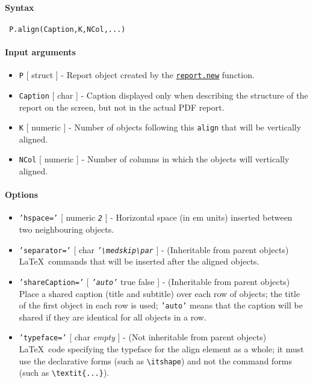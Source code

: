 


	\paragraph{Syntax}
 
 \begin{verbatim}
 P.align(Caption,K,NCol,...)
 \end{verbatim}
 
 \paragraph{Input arguments}
 
 \begin{itemize}
 \item
   \texttt{P} {[} struct {]} - Report object created by the
   \href{report/new}{\texttt{report.new}} function.
 \item
   \texttt{Caption} {[} char {]} - Caption displayed only when describing
   the structure of the report on the screen, but not in the actual PDF
   report.
 \item
   \texttt{K} {[} numeric {]} - Number of objects following this
   \texttt{align} that will be vertically aligned.
 \item
   \texttt{NCol} {[} numeric {]} - Number of columns in which the objects
   will vertically aligned.
 \end{itemize}
 
 \paragraph{Options}
 
 \begin{itemize}
 \item
   \texttt{'hspace='} {[} numeric \textbar{} \emph{\texttt{2}} {]} -
   Horizontal space (in em units) inserted between two neighbouring
   objects.
 \item
   \texttt{'separator='} {[} char \textbar{}
   \emph{\texttt{'\textbackslash{}medskip\textbackslash{}par}} {]} -
   (Inheritable from parent objects) \LaTeX~commands that will be
   inserted after the aligned objects.
 \item
   \texttt{'shareCaption='} {[} \emph{\texttt{'auto'}} \textbar{} true
   \textbar{} false {]} - (Inheritable from parent objects) Place a
   shared caption (title and subtitle) over each row of objects; the
   title of the first object in each row is used; \texttt{'auto'} means
   that the caption will be shared if they are identical for all objects
   in a row.
 \item
   \texttt{'typeface='} {[} char \textbar{} \emph{empty} {]} - (Not
   inheritable from parent objects) \LaTeX~code specifying the typeface
   for the align element as a whole; it must use the declarative forms
   (such as \texttt{\textbackslash{}itshape}) and not the command forms
   (such as \texttt{\textbackslash{}textit\{...\}}).
 \end{itemize}
 
